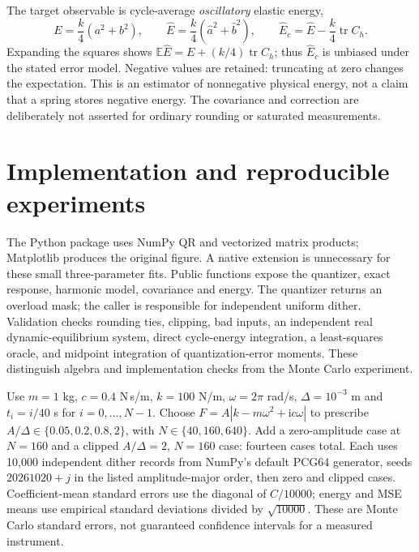 \documentclass[10pt,a4paper]{article}
\begin{document}
The target observable is cycle-average \emph{oscillatory} elastic energy,
\begin{equation}
 E=\frac{k}{4}(a^2+b^2),\qquad
 \widehat E=\frac{k}{4}(\widehat a^2+\widehat b^2),\qquad
 \widehat E_c=\widehat E-\frac{k}{4}\operatorname{tr}C_h.
 \label{eq:energy}
\end{equation}
Expanding the squares shows $\mathbb E\widehat E=E+(k/4)\operatorname{tr}C_h$;
thus $\widehat E_c$ is unbiased under the stated error model. Negative values are
retained: truncating at zero changes the expectation. This is an estimator of
nonnegative physical energy, not a claim that a spring stores negative energy.
The covariance and correction are deliberately not asserted for ordinary
rounding or saturated measurements.

\section{Implementation and reproducible experiments}
The Python package uses NumPy QR and vectorized matrix products; Matplotlib
produces the original figure. A native extension is unnecessary for these small
three-parameter fits. Public functions expose the quantizer, exact response,
harmonic model, covariance and energy. The quantizer returns an overload mask;
the caller is responsible for independent uniform dither. Validation checks
rounding ties, clipping, bad inputs, an independent real dynamic-equilibrium
system, direct cycle-energy integration, a least-squares oracle, and midpoint
integration of quantization-error moments. These distinguish algebra and
implementation checks from the Monte Carlo experiment.

Use $m=1$ kg, $c=0.4$ N\,s/m, $k=100$ N/m, $\omega=2\pi$ rad/s,
$\Delta=10^{-3}$ m and $t_i=i/40$ s for $i=0,\ldots,N-1$.
Choose $F=A|k-m\omega^2+\mathrm{i}c\omega|$ to prescribe
$A/\Delta\in\{0.05,0.2,0.8,2\}$, with $N\in\{40,160,640\}$.
Add a zero-amplitude case at $N=160$ and a clipped $A/\Delta=2$, $N=160$ case:
fourteen cases total. Each uses 10,000 independent dither records from NumPy's
default PCG64 generator, seeds $20261020+j$ in the listed amplitude-major order,
then zero and clipped cases. Coefficient-mean standard errors use the diagonal
of $C/10000$; energy and MSE means use empirical standard deviations divided
by $\sqrt{10000}$. These are Monte Carlo
standard errors, not guaranteed confidence intervals for a measured instrument.

\clearpage
\end{document}
